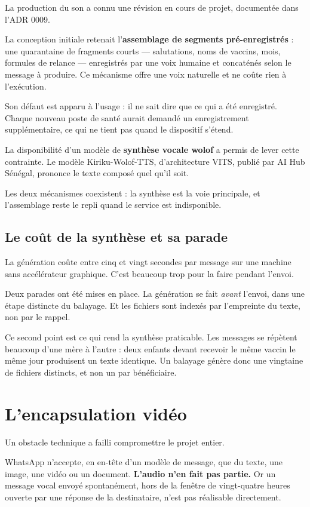 \documentclass[11pt,a4paper]{report}
\begin{document}
La production du son a connu une révision en cours de projet, documentée
dans l'ADR 0009.

La conception initiale retenait l'\textbf{assemblage de segments
pré-enregistrés} : une quarantaine de fragments courts — salutations, noms
de vaccins, mois, formules de relance — enregistrés par une voix humaine et
concaténés selon le message à produire. Ce mécanisme offre une voix naturelle
et ne coûte rien à l'exécution.

Son défaut est apparu à l'usage : il ne sait dire que ce qui a été
enregistré. Chaque nouveau poste de santé aurait demandé un enregistrement
supplémentaire, ce qui ne tient pas quand le dispositif s'étend.

La disponibilité d'un modèle de \textbf{synthèse vocale wolof} a permis de
lever cette contrainte. Le modèle Kiriku-Wolof-TTS, d'architecture VITS,
publié par AI Hub Sénégal, prononce le texte composé quel qu'il soit.

Les deux mécanismes coexistent : la synthèse est la voie principale, et
l'assemblage reste le repli quand le service est indisponible.

\subsection{Le coût de la synthèse et sa parade}

La génération coûte entre cinq et vingt secondes par message sur une machine
sans accélérateur graphique. C'est beaucoup trop pour la faire pendant
l'envoi.

Deux parades ont été mises en place. La génération se fait \emph{avant}
l'envoi, dans une étape distincte du balayage. Et les fichiers sont indexés
par l'empreinte du texte, non par le rappel.

Ce second point est ce qui rend la synthèse praticable. Les messages se
répètent beaucoup d'une mère à l'autre : deux enfants devant recevoir le même
vaccin le même jour produisent un texte identique. Un balayage génère donc une
vingtaine de fichiers distincts, et non un par bénéficiaire.

\section{L'encapsulation vidéo}

Un obstacle technique a failli compromettre le projet entier.

WhatsApp n'accepte, en en-tête d'un modèle de message, que du texte, une
image, une vidéo ou un document. \textbf{L'audio n'en fait pas partie.} Or
un message vocal envoyé spontanément, hors de la fenêtre de vingt-quatre
heures ouverte par une réponse de la destinataire, n'est pas réalisable
directement.
\end{document}
